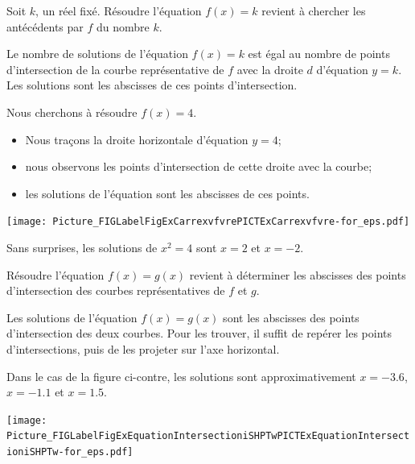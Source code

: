 \begin{Aretenir}
    Soit $k$, un réel fixé. Résoudre l'équation $f(x)=k$ revient à chercher les antécédents par $f$ du nombre $k$.

Le nombre de solutions de l'équation $f(x)=k$ est égal au nombre de points d'intersection de la courbe représentative de \( f\) avec la droite $d$ d'équation $y=k$. Les solutions sont les abscisses de ces points d'intersection. 
\end{Aretenir}


\begin{example}
    \begin{multicols}{2}
  Nous cherchons à résoudre $f(x)=4$. 
  \begin{itemize}
      \item 
          Nous traçons la droite horizontale d'équation \( y=4\);
      \item
          nous observons les points d'intersection de cette droite avec la courbe;
      \item
          les solutions de l'équation sont les abscisses de ces points.
  \end{itemize}

\columnbreak

\texttt{[image: Picture\_FIGLabelFigExCarrexvfvrePICTExCarrexvfvre-for\_eps.pdf]}

    \end{multicols}

    Sans surprises, les solutions de \( x^2=4\) sont \( x=2\) et \( x=-2\).

\end{example}

\begin{Aretenir}
    Résoudre l'équation $f(x)=g(x)$ revient à déterminer les abscisses des points d'intersection des courbes représentatives de \( f\) et \( g\).
\end{Aretenir}


\begin{multicols}{2}

    Les solutions de l'équation \( f(x)=g(x)\) sont les abscisses des points d'intersection des deux courbes. Pour les trouver, il suffit de repérer les points d'intersections, puis de les projeter sur l'axe horizontal.

    Dans le cas de la figure ci-contre, les solutions sont approximativement \( x=-3.6\), \( x=-1.1\) et \( x=1.5\).

\columnbreak

\texttt{[image: Picture\_FIGLabelFigExEquationIntersectioniSHPTwPICTExEquationIntersectioniSHPTw-for\_eps.pdf]}

\end{multicols}


